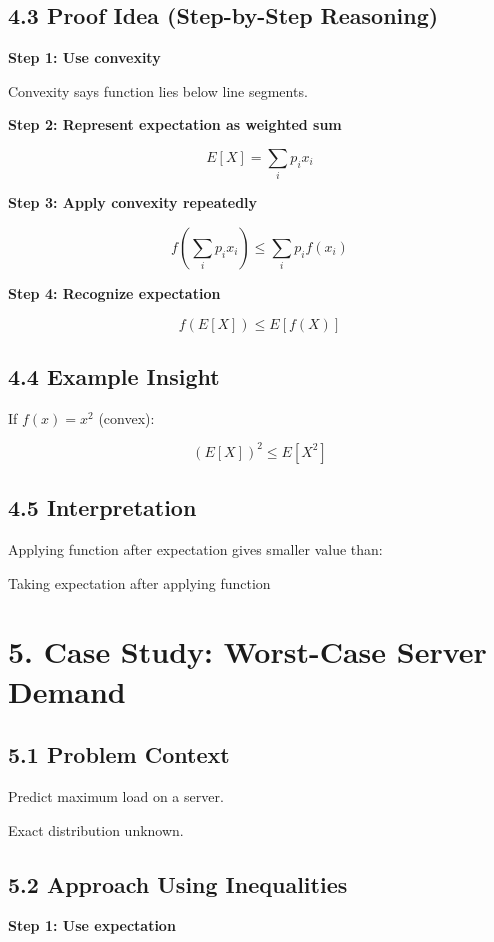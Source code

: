 \documentclass[12pt]{article}
\begin{document}
\subsection*{4.3 Proof Idea (Step-by-Step Reasoning)}

\textbf{Step 1: Use convexity}

Convexity says function lies below line segments.

\textbf{Step 2: Represent expectation as weighted sum}

\[
E[X] = \sum_i p_i x_i
\]

\textbf{Step 3: Apply convexity repeatedly}

\[
f\left(\sum_i p_i x_i\right) \le \sum_i p_i f(x_i)
\]

\textbf{Step 4: Recognize expectation}

\[
f(E[X]) \le E[f(X)]
\]

\subsection*{4.4 Example Insight}

If $f(x) = x^2$ (convex):

\[
(E[X])^2 \le E[X^2]
\]

\subsection*{4.5 Interpretation}

Applying function after expectation gives smaller value than:

Taking expectation after applying function

\section*{5. Case Study: Worst-Case Server Demand}

\subsection*{5.1 Problem Context}

Predict maximum load on a server.

Exact distribution unknown.

\subsection*{5.2 Approach Using Inequalities}

\textbf{Step 1: Use expectation}
\end{document}
